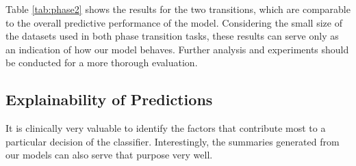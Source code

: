 \documentclass[11pt]{article}
\begin{document}
Table \ref{tab:phase2} shows the results for the two transitions, which are comparable to the overall predictive performance of the model.
Considering the small size of the datasets used in both phase transition tasks, these results can serve only as an indication of how our model behaves. Further analysis and experiments should be conducted for a more thorough evaluation.




\subsection{Explainability of Predictions}
It is clinically very valuable to identify the factors that contribute most to a particular decision of the classifier.
Interestingly, the summaries generated from our models can also serve that purpose very well.
\end{document}
